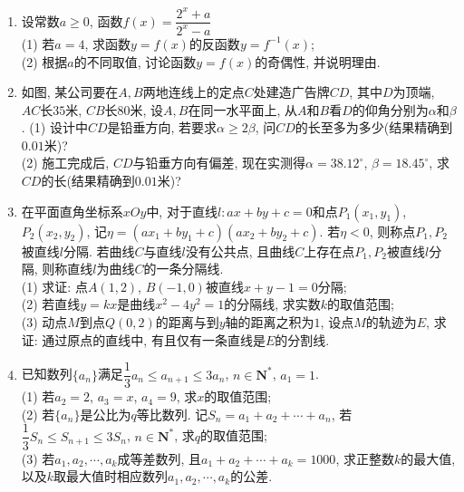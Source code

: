 \documentclass[10pt,a4paper]{article}
\begin{document}
\begin{enumerate}[1.]
\begin{center}
\end{center}
\item 设常数$a\ge 0$, 函数$f(x)=\dfrac{2^x+a}{2^x-a}$\\
(1) 若$a=4$, 求函数$y=f(x)$的反函数$y=f^{-1}(x)$;\\
(2) 根据$a$的不同取值, 讨论函数$y=f(x)$的奇偶性, 并说明理由.
\item 如图, 某公司要在$A,B$两地连线上的定点$C$处建造广告牌$CD$, 其中$D$为顶端, $AC$长$35$米, $CB$长$80$米, 设$A,B$在同一水平面上, 从$A$和$B$看$D$的仰角分别为$\alpha$和$\beta$.
(1) 设计中$CD$是铅垂方向, 若要求$\alpha\ge 2\beta$, 问$CD$的长至多为多少(结果精确到$0.01$米)?\\
(2) 施工完成后, $CD$与铅垂方向有偏差, 现在实测得$\alpha=38.12^\circ$, $\beta=18.45^\circ$, 求$CD$的长(结果精确到$0.01$米)?
\begin{center}
\end{center}
\item 在平面直角坐标系$xOy$中, 对于直线$l:ax+by+c=0$和点$P_1(x_1,y_1)$, $P_2(x_2,y_2)$, 记$\eta=(ax_1+by_1+c)(ax_2+by_2+c)$. 若$\eta<0$, 则称点$P_1,P_2$被直线$l$分隔. 若曲线$C$与直线$l$没有公共点, 且曲线$C$上存在点$P_1,P_2$被直线$l$分隔, 则称直线$l$为曲线$C$的一条分隔线.\\
(1) 求证: 点$A(1,2)$, $B(-1,0)$被直线$x+y-1=0$分隔;\\
(2) 若直线$y=kx$是曲线$x^2-4y^2=1$的分隔线, 求实数$k$的取值范围;\\
(3) 动点$M$到点$Q(0,2)$的距离与到$y$轴的距离之积为$1$, 设点$M$的轨迹为$E$, 求证: 通过原点的直线中, 有且仅有一条直线是$E$的分割线.
\item 已知数列$\{a_n\}$满足$\dfrac 13a_n\le a_{n+1}\le 3a_n$, $n\in \mathbf{N}^*$, $a_1=1$.\\
(1) 若$a_2=2$, $a_3=x$, $a_4=9$, 求$x$的取值范围;\\
(2) 若$\{a_n\}$是公比为$q$等比数列. 记$S_n=a_1+a_2+\cdots+a_n$, 若$\dfrac13 S_n\le S_{n+1}\le 3S_n$, $n\in \mathbf{N}^*$, 求$q$的取值范围;\\
(3) 若$a_1,a_2,\cdots,a_k$成等差数列, 且$a_1+a_2+\cdots+a_k=1000$, 求正整数$k$的最大值, 以及$k$取最大值时相应数列$a_1,a_2,\cdots,a_k$的公差.


\end{enumerate}
\end{document}
